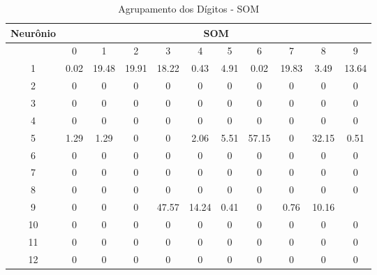 \begin{table}[h]
\centering
\caption{Agrupamento dos Dígitos - SOM}
\label{my-label}
\begin{tabular}{|c|c|c|c|c|c|c|c|c|c|c|}
\hline
Neurônio & \multicolumn{10}{c|}{SOM}                                                   \\ \hline
         & 0    & 1     & 2     & 3     & 4     & 5    & 6     & 7     & 8     & 9     \\ \hline
1        & 0.02 & 19.48 & 19.91 & 18.22 & 0.43  & 4.91 & 0.02  & 19.83 & 3.49  & 13.64 \\ \hline
2        & 0    & 0     & 0     & 0     & 0     & 0    & 0     & 0     & 0     & 0     \\ \hline
3        & 0    & 0     & 0     & 0     & 0     & 0    & 0     & 0     & 0     & 0     \\ \hline
4        & 0    & 0     & 0     & 0     & 0     & 0    & 0     & 0     & 0     & 0     \\ \hline
5        & 1.29 & 1.29  & 0     & 0     & 2.06  & 5.51 & 57.15 & 0     & 32.15 & 0.51  \\ \hline
6        & 0    & 0     & 0     & 0     & 0     & 0    & 0     & 0     & 0     & 0     \\ \hline
7        & 0    & 0     & 0     & 0     & 0     & 0    & 0     & 0     & 0     & 0     \\ \hline
8        & 0    & 0     & 0     & 0     & 0     & 0    & 0     & 0     & 0     & 0     \\ \hline
9        & 0    & 0     & 0     & 47.57 & 14.24 & 0.41 & 0     & 0.76  & 10.16 &       \\ \hline
10       & 0    & 0     & 0     & 0     & 0     & 0    & 0     & 0     & 0     & 0     \\ \hline
11       & 0    & 0     & 0     & 0     & 0     & 0    & 0     & 0     & 0     & 0     \\ \hline
12       & 0    & 0     & 0     & 0     & 0     & 0    & 0     & 0     & 0     & 0     \\ \hline
\end{tabular}
\end{table}


